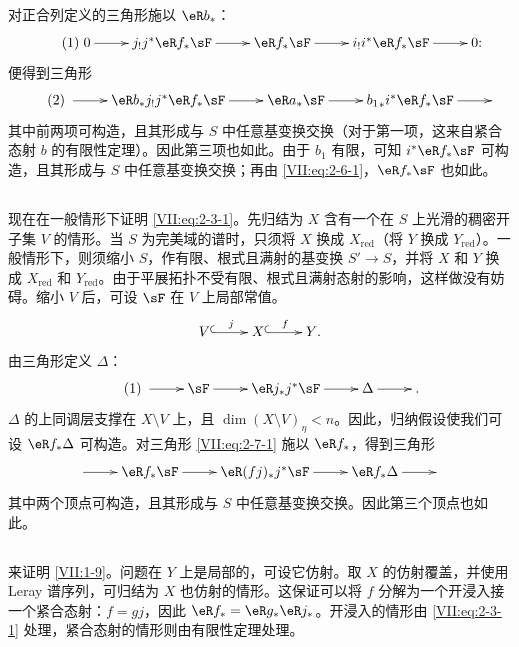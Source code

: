 对正合列定义的三角形施以 $\eR b_\ast$：
\begin{equation*}\tag{1}\label{VII:eq:2-6-1}
\xymatrix{
  0 \ar[r]
    & j_! j^\ast \eR f_\ast \sF \ar[r]
    & \eR f_\ast \sF \ar[r]
    & i_! i^\ast \eR f_\ast \sF \ar[r]
    & 0 \text{:}
}
\end{equation*}
便得到三角形
\begin{equation*}\tag{2}\label{VII:eq:2-6-2}
\xymatrix{
  \ar[r]
    & \eR b_\ast j_! j^\ast \eR f_\ast \sF \ar[r]
    & \eR a_\ast \sF \ar[r]
    & {b_1}_\ast i^\ast \eR f_\ast \sF \ar[r]
    &
}
\end{equation*}
其中前两项可构造，且其形成与 $S$ 中任意基变换交换（对于第一项，这来自紧合态射 $b$ 的有限性定理）。因此第三项也如此。由于 $b_1$ 有限，可知 $i^\ast \eR f_\ast \sF$ 可构造，且其形成与 $S$ 中任意基变换交换；再由 \eqref{VII:eq:2-6-1}，$\eR f_\ast \sF$ 也如此。

\subsection{}\label{VII:2-7}

现在在一般情形下证明 \eqref{VII:eq:2-3-1}。先归结为 $X$ 含有一个在 $S$ 上光滑的稠密开子集 $V$ 的情形。当 $S$ 为完美域的谱时，只须将 $X$ 换成 $X_\text{red}$（将 $Y$ 换成 $Y_\text{red}$）。一般情形下，则须缩小 $S$，作有限、根式且满射的基变换 $S' \to S$，并将 $X$ 和 $Y$ 换成 $X_\text{red}$ 和 $Y_\text{red}$。由于平展拓扑不受有限、根式且满射态射的影响，这样做没有妨碍。缩小 $V$ 后，可设 $\sF$ 在 $V$ 上局部常值。
\[\xymatrix{
  V \ar@{^{(}->}[r]^j
    & X \ar@{^{(}->}[r]^-f
    & Y \text{.}
}\]
由三角形定义 $\Delta$：
\begin{equation*}\tag{1}\label{VII:eq:2-7-1}
\xymatrix{
  \ar[r]
    & \sF \ar[r]
    & \eR j_\ast j^\ast \sF \ar[r]
    & \Delta \ar[r]
    & \text{.}
}
\end{equation*}
$\Delta$ 的上同调层支撑在 $X\setminus V$ 上，且 $\dim(X\setminus V)_\eta < n$。因此，归纳假设使我们可设 $\eR f_\ast \Delta$ 可构造。对三角形 \eqref{VII:eq:2-7-1} 施以 $\eR f_\ast$，得到三角形
\[\xymatrix{
  \ar[r]
    & \eR f_\ast \sF \ar[r]
    & \eR(f j)_\ast j^\ast \sF \ar[r]
    & \eR f_\ast \Delta \ar[r]
    &
}\]
其中两个顶点可构造，且其形成与 $S$ 中任意基变换交换。因此第三个顶点也如此。

\subsection{}\label{VII:2-8}

来证明 \ref{VII:1-9}。问题在 $Y$ 上是局部的，可设它仿射。取 $X$ 的仿射覆盖，并使用 Leray 谱序列，可归结为 $X$ 也仿射的情形。这保证可以将 $f$ 分解为一个开浸入接一个紧合态射：$f=g j$，因此 $\eR f_\ast = \eR g_\ast \eR j_\ast$。开浸入的情形由 \eqref{VII:eq:2-3-1} 处理，紧合态射的情形则由有限性定理处理。

